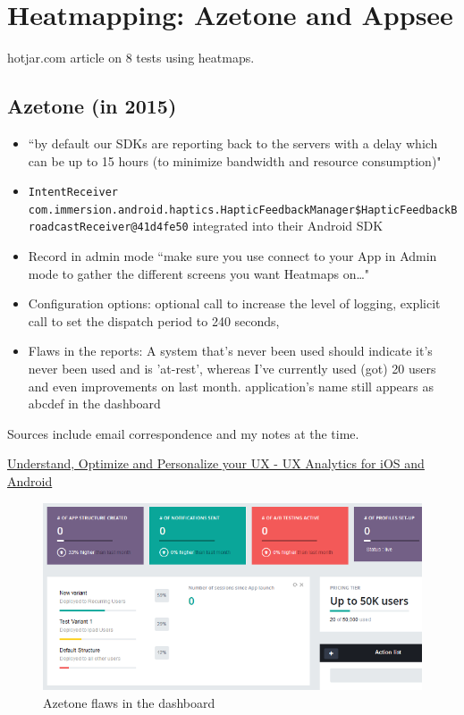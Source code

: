 \section{Heatmapping: Azetone and Appsee}

hotjar.com article on 8 tests using heatmaps.

\subsection{Azetone (in 2015)}
\begin{itemize}
    \item ``by default our SDKs are reporting back to the servers with a delay which can be up to 15 hours (to minimize bandwidth and resource consumption)"
    \item  \texttt{IntentReceiver com.immersion.android.haptics.HapticFeedbackManager\$HapticFeedbackBroadcastReceiver@41d4fe50} integrated into their Android SDK
    \item Record in admin mode ``make sure you use connect to your App in Admin mode to gather the different screens you want Heatmaps on…"
    \item Configuration options: optional call to increase the level of logging, explicit call to set the dispatch period to 240 seconds,
    \item Flaws in the reports: A system that's never been used should indicate it's never been used and is 'at-rest', whereas I've currently used (got) 20 users and even improvements on last month. application's name still appears as abcdef in the dashboard
\end{itemize}
Sources include email correspondence and my notes at the time.

\href{https://www.azetone.com/mobile-ux-analytics/}{Understand, Optimize and Personalize your UX - UX Analytics for iOS and Android}

\begin{figure}
    \centering
    \includegraphics[width=16cm]{images/azetone/azetone_dashboard_flaws_for_kiwix_2015.png}
    \caption{Azetone flaws in the dashboard}
    \label{fig:azetone_dashboard_flaws_for_kiwix_2015}
\end{figure}



